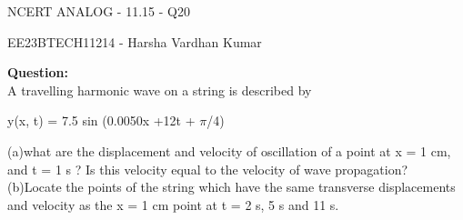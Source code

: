 \documentclass{article}
\begin{document}
\vspace{3cm}
\begin{center}
  \Huge{NCERT ANALOG - 11.15 - Q20}
\end{center}
\begin{center}
    \Large {EE23BTECH11214 - Harsha Vardhan Kumar}
\end{center}
\bigskip
\begin{paracol}{2}
\begin{leftcolumn}
\noindent
\noindent\textbf{Question:}
\\ A travelling harmonic wave on a string is described by
\begin{center}
    y(x, t) = 7.5 sin (0.0050x +12t +  $\pi$/4)
\end{center} 
(a)what are the displacement and velocity of oscillation of a point at
x = 1 cm, and t = 1 s ? Is this velocity equal to the velocity of wave propagation?
\\(b)Locate the points of the string which have the same transverse displacements
and velocity as the x = 1 cm point at t = 2 s, 5 s and 11 s.
\end{leftcolumn}
\end{paracol}
\end{document}
